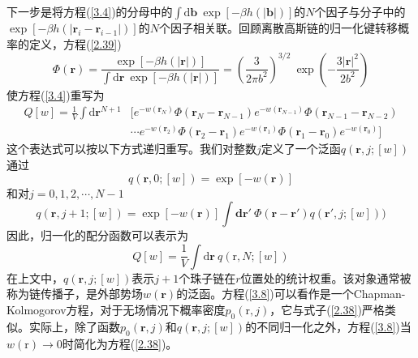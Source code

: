 下一步是将方程(\ref{3.4})的分母中的$\int\mathrm{d}\mathbf{b}~\exp[-\beta h(\left|\mathbf{b}\right|)]$的$N$个因子与分子中的$\exp[-\beta h(\left|\mathbf{r}_i-\mathbf{r}_{i-1}\right|)]$的$N$个因子相关联。回顾离散高斯链的归一化键转移概率的定义，方程(\ref{2.39})
\begin{equation}\label{3.5}
\Phi(\mathbf{r})=\frac{\exp[-\beta h(\left|\mathbf{r}\right|)]}{\int\mathrm{d}\mathbf{r}~\exp[-\beta h(\left|\mathbf{r}\right|)]}=\left(\frac{3}{2\pi b^2}\right)^{3/2}~\exp\left(-\frac{3\left|\mathbf{r}\right|^2}{2b^2}\right)
\end{equation}
使方程(\ref{3.4})重写为
\begin{equation}\label{3.6}
\begin{aligned}
Q[w]=\frac{1}{V}\int\mathrm{d}\mathbf{r}^{N+1}&[e^{-w(\mathbf{r}_N)}\Phi(\mathbf{r}_N-\mathbf{r}_{N-1})e^{-w(\mathbf{r}_{N-1})}\Phi(\mathbf{r}_{N-1}-\mathbf{r}_{N-2})\\
&\cdots e^{-w(\mathbf{r}_2)}\Phi(\mathbf{r}_2-\mathbf{r}_1)e^{-w(\mathbf{r}_1)}\Phi(\mathbf{r}_1-\mathbf{r}_0)e^{-w(\mathbf{r}_0)}]
\end{aligned}
\end{equation}
这个表达式可以按以下方式递归重写。我们对整数$j$定义了一个泛函$q(\mathbf{r},j;[w])$通过
\begin{equation}\label{3.7}
q(\mathbf{r},0;[w])=\exp[-w(\mathbf{r})]
\end{equation}
和对$j=0,1,2,\cdots,N-1$
\begin{equation}\label{3.8}
q(\mathbf{r},j+1;[w])=\exp[-w(\mathbf{r})]\int\mathbf{d}\mathbf{r}'~\Phi(\mathbf{r}-\mathbf{r}')q(\mathbf{r}',j;[w]))
\end{equation}
因此，归一化的配分函数可以表示为
\begin{equation}\label{3.9}
Q[w]=\frac{1}{V}\int\mathrm{d}\mathbf{r}~q(\mathrm{r},N;[w])
\end{equation}
在上文中，$q(\mathbf{r},j;[w])$表示$j+1$个珠子链在$r$位置处的统计权重。该对象通常被称为链传播子，是外部势场$w(\mathbf{r})$的泛函。方程(\ref{3.8})可以看作是一个Chapman-Kolmogorov方程，对于无场情况下概率密度$p_0(\mathrm{r},j)$，它与式子(\ref{2.38})严格类似。实际上，除了函数$p_0(\mathbf{r},j)$和$q(\mathbf{r},j;[w])$的不同归一化之外，方程(\ref{3.8})当$w(\mathrm{r})\rightarrow 0$时简化为方程(\ref{2.38})。

